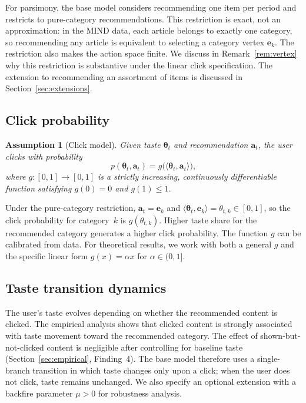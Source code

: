 \documentclass[11pt]{article}
\newtheorem{assumption}{Assumption}
\begin{document}
For parsimony, the base model considers recommending one item per period and restricts to pure-category recommendations. This restriction is exact, not an approximation: in the MIND data, each article belongs to exactly one category, so recommending any article is equivalent to selecting a category vertex $\mathbf{e}_k$. The restriction also makes the action space finite. We discuss in Remark~\ref{rem:vertex} why this restriction is substantive under the linear click specification. The extension to recommending an assortment of items is discussed in Section~\ref{sec:extensions}.

\subsection{Click probability}

\begin{assumption}[Click model]\label{as:click}
Given taste $\boldsymbol{\theta}_t$ and recommendation $\mathbf{a}_t$, the user clicks with probability
\[
p(\boldsymbol{\theta}_t, \mathbf{a}_t) = g\bigl(\langle \boldsymbol{\theta}_t, \mathbf{a}_t \rangle\bigr),
\]
where $g: [0,1] \to [0,1]$ is a strictly increasing, continuously differentiable function satisfying $g(0) = 0$ and $g(1) \le 1$.
\end{assumption}

Under the pure-category restriction, $\mathbf{a}_t = \mathbf{e}_k$ and $\langle \boldsymbol{\theta}_t, \mathbf{e}_k \rangle = \theta_{t,k} \in [0,1]$, so the click probability for category~$k$ is $g(\theta_{t,k})$. Higher taste share for the recommended category generates a higher click probability. The function $g$ can be calibrated from data. For theoretical results, we work with both a general $g$ and the specific linear form $g(x) = \alpha x$ for $\alpha \in (0, 1]$.

\subsection{Taste transition dynamics}

The user's taste evolves depending on whether the recommended content is clicked. The empirical analysis shows that clicked content is strongly associated with taste movement toward the recommended category. The effect of shown-but-not-clicked content is negligible after controlling for baseline taste (Section~\ref{sec:empirical}, Finding~4). The base model therefore uses a single-branch transition in which taste changes only upon a click; when the user does not click, taste remains unchanged. We also specify an optional extension with a backfire parameter $\mu > 0$ for robustness analysis.
\end{document}
